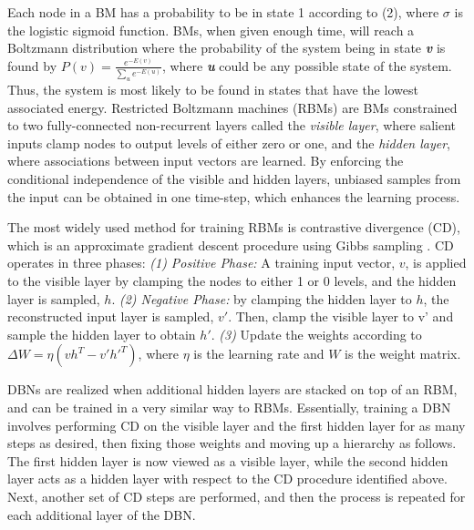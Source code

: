 Each node in a BM has a probability to be in state 1 according to (2), where $\sigma$ is the logistic sigmoid function. BMs, when given enough time, will reach a Boltzmann distribution where the probability of the system being in state \textit{\textbf{v}} is found by $P(v) = \frac{e^{-E(v)}}{\sum_{u} e^{-E(u)}}$, where \textit{\textbf{u}} could be any possible state of the system. Thus, the system is most likely to be found in states that have the lowest associated energy.
Restricted Boltzmann machines (RBMs) are BMs constrained to two fully-connected non-recurrent layers called the \textit{visible layer}, where salient inputs clamp nodes to output levels of either zero or one, and the \textit{hidden layer}, where associations between input vectors are learned. By enforcing the conditional independence of the visible and hidden layers, unbiased samples from the input can be obtained in one time-step, which enhances the learning process. 

The most widely used method for training RBMs is contrastive divergence (CD), which is an approximate gradient descent procedure using Gibbs sampling \cite{carreira2005}. CD operates in three phases: \textit{(1) Positive Phase:} A training input vector, \textbf{$v$}, is applied to the visible layer by clamping the nodes to either 1 or 0 levels, and the hidden layer is sampled, \textbf{$h$}. \textit{(2) Negative Phase:} by clamping the hidden layer to \textbf{$h$}, the reconstructed input layer is sampled, \textbf{$v'$}. Then, clamp the visible layer to v' and sample the hidden layer to obtain \textbf{$h'$}. \textit{(3)} Update the weights according to $\Delta W = \eta (vh^T-v'h'^T)$, where $\eta$ is the learning rate and \textbf{$W$} is the weight matrix. 

DBNs are realized when additional hidden layers are stacked on top of an RBM, and can be trained in a very similar way to RBMs. Essentially, training a DBN involves performing CD on the visible layer and the first hidden layer for as many steps as desired, then fixing those weights and moving up a hierarchy as follows. The first hidden layer is now viewed as a visible layer, while the second hidden layer acts as a hidden layer with respect to the CD procedure identified above. Next, another set of CD steps are performed, and then the process is repeated for each additional layer of the DBN.



